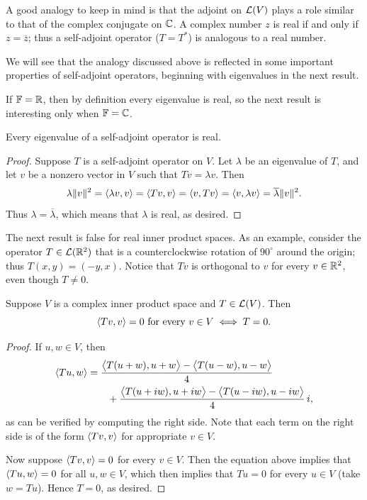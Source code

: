 A good analogy to keep in mind is that the adjoint on $\mathcal{L}(V)$ plays a role
similar to that of the complex conjugate on $\mathbb{C}$. A complex number $z$ is real
if and only if $z=\overline{z}$; thus a self-adjoint operator ($T=T^*$) is
analogous to a real number.

%
We will see that the analogy discussed above is reflected in some important
properties of self-adjoint operators, beginning with eigenvalues in the next
result.

If $\mathbb{F}=\mathbb{R}$, then by definition every eigenvalue is real, so the next result is
interesting only when $\F=\C$.

\begin{result}\label{ax:7.12}
Every eigenvalue of a self-adjoint operator is real.
\end{result}

\begin{proof}
Suppose $T$ is a self-adjoint operator on $V$. Let $\lambda$ be an eigenvalue of
$T$, and let $v$ be a nonzero vector in $V$ such that $Tv=\lambda v$. Then
\[ \lambda\lVert v \rVert^2 = \langle \lambda v, v \rangle = \langle Tv, v \rangle = \langle v, Tv \rangle
   = \langle v, \lambda v \rangle = \overline{\lambda}\lVert v \rVert^2. \]
Thus $\lambda=\overline{\lambda}$, which means that $\lambda$ is real, as
desired.
\end{proof}

The next result is false for real inner product spaces. As an example, consider
the operator $T\in\mathcal{L}(\mathbb{R}^2)$ that is a counterclockwise rotation of $90^\circ$
around the origin; thus $T(x,y)=(-y,x)$. Notice that $Tv$ is orthogonal to $v$
for every $v\in\mathbb{R}^2$, even though $T\ne0$.

\begin{result}[$Tv$ is orthogonal to $v$ for all $v$ $\iff$ $T=0$ (assuming
$\F=\C$)]\label{ax:7.13}
Suppose $V$ is a complex inner product space and $T\in\mathcal{L}(V)$. Then
\[ \langle Tv, v \rangle=0 \text{ for every } v\in V \iff T=0. \]
\end{result}

\begin{proof}
If $u,w\in V$, then
\begin{align*}
\langle Tu, w \rangle &= \frac{\bigl\langle T(u+w),u+w\bigr\rangle
                    -\bigl\langle T(u-w),u-w\bigr\rangle}{4}\\
  &\qquad+\frac{\bigl\langle T(u+iw),u+iw\bigr\rangle
                -\bigl\langle T(u-iw),u-iw\bigr\rangle}{4}\,i,
\end{align*}
as can be verified by computing the right side. Note that each term on the
right side is of the form $\langle Tv, v \rangle$ for appropriate $v\in V$.

Now suppose $\langle Tv, v \rangle=0$ for every $v\in V$. Then the equation above implies
that $\langle Tu, w \rangle=0$ for all $u,w\in V$, which then implies that $Tu=0$ for every
$u\in V$ (take $w=Tu$). Hence $T=0$, as desired.
\end{proof}

